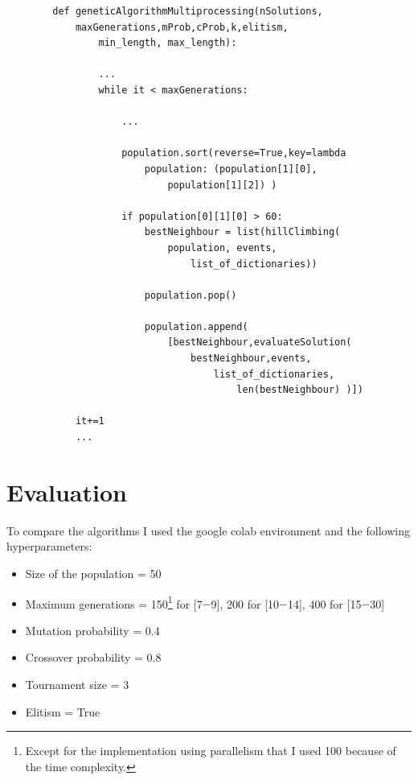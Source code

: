 \documentclass{article}
\begin{document}
\begin{lstlisting}
        def geneticAlgorithmMultiprocessing(nSolutions,
            maxGenerations,mProb,cProb,k,elitism, 
                min_length, max_length):
    
                ...
                while it < maxGenerations:
    
                    ...

                    population.sort(reverse=True,key=lambda 
                        population: (population[1][0], 
                            population[1][2]) )

                    if population[0][1][0] > 60:
                        bestNeighbour = list(hillClimbing(
                            population, events, 
                                list_of_dictionaries))
            
                        population.pop()
                
                        population.append(
                            [bestNeighbour,evaluateSolution(
                                bestNeighbour,events,
                                    list_of_dictionaries,
                                        len(bestNeighbour) )])
            
            it+=1
            ...
    \end{lstlisting}

    \newpage

    \section{Evaluation}

    To compare the algorithms I used the google colab environment and the 
    following hyperparameters: 

    \begin{itemize}
        \item Size of the population = 50
        \item Maximum generations = 150\footnote{Except for the implementation using parallelism that I used 100 because of the time complexity.} for [7$-$9], 200 for [10$-$14], 400 for [15$-$30]
        \item Mutation probability = 0.4
        \item Crossover probability = 0.8
        \item Tournament size = 3
        \item Elitism = True
    \end{itemize}
\end{document}
